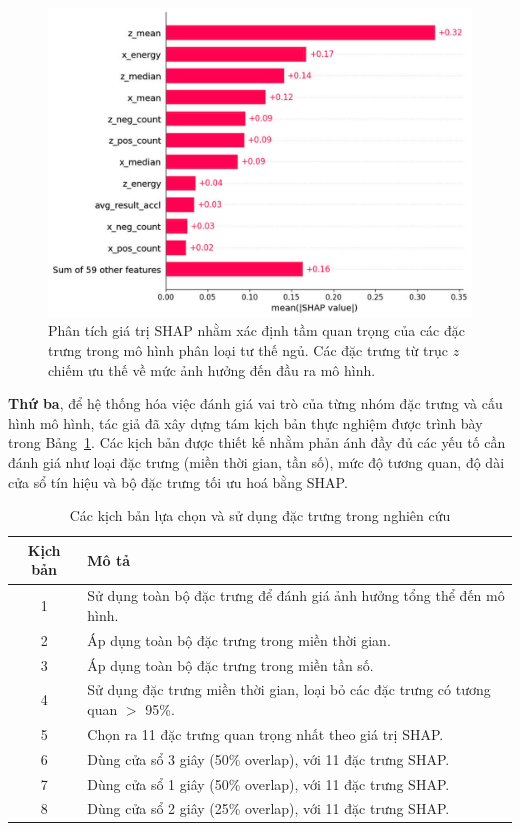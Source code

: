 \begin{figure}[htbp]
\centering
\includegraphics[width=0.8\linewidth]{images/shap20.jpg} 
\caption{Phân tích giá trị SHAP nhằm xác định tầm quan trọng của các đặc trưng trong mô hình phân loại tư thế ngủ. Các đặc trưng từ trục $z$ chiếm ưu thế về mức ảnh hưởng đến đầu ra mô hình.}
\label{fig:shap}
\end{figure}

\textbf{Thứ ba}, để hệ thống hóa việc đánh giá vai trò của từng nhóm đặc trưng và cấu hình mô hình, tác giả đã xây dựng tám kịch bản thực nghiệm được trình bày trong Bảng~\ref{tab:scenarios}. Các kịch bản được thiết kế nhằm phản ánh đầy đủ các yếu tố cần đánh giá như loại đặc trưng (miền thời gian, tần số), mức độ tương quan, độ dài cửa sổ tín hiệu và bộ đặc trưng tối ưu hoá bằng SHAP.

\begin{table}[htbp]
\caption{Các kịch bản lựa chọn và sử dụng đặc trưng trong nghiên cứu}
\label{tab:scenarios}
\begin{center}
\renewcommand{\arraystretch}{1.2}
\begin{tabular}{|c|p{6.1cm}|}
\hline
\textbf{Kịch bản} & \textbf{Mô tả} \\
\hline
1 & Sử dụng toàn bộ đặc trưng để đánh giá ảnh hưởng tổng thể đến mô hình. \\
\hline
2 & Áp dụng toàn bộ đặc trưng trong miền thời gian. \\
\hline
3 & Áp dụng toàn bộ đặc trưng trong miền tần số. \\
\hline
4 & Sử dụng đặc trưng miền thời gian, loại bỏ các đặc trưng có tương quan $>$ 95\%. \\
\hline
5 & Chọn ra 11 đặc trưng quan trọng nhất theo giá trị SHAP. \\
\hline
6 & Dùng cửa sổ 3 giây (50\% overlap), với 11 đặc trưng SHAP. \\
\hline
7 & Dùng cửa sổ 1 giây (50\% overlap), với 11 đặc trưng SHAP. \\
\hline
8 & Dùng cửa sổ 2 giây (25\% overlap), với 11 đặc trưng SHAP. \\
\hline
\end{tabular}
\end{center}
\end{table}

